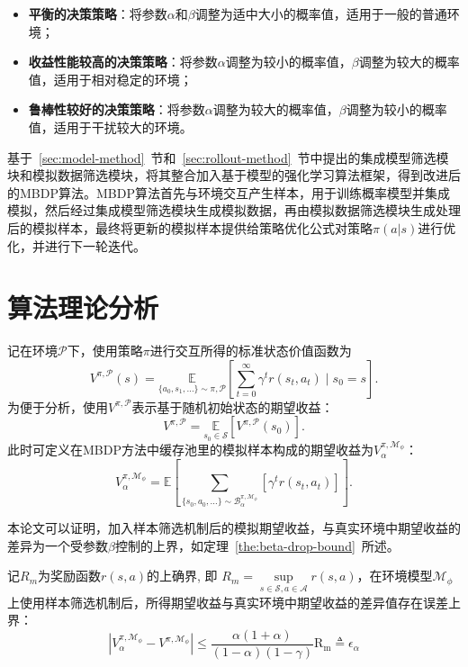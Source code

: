 \begin{itemize}
    \item \textbf{平衡的决策策略}：将参数$\alpha$和$\beta$调整为适中大小的概率值，适用于一般的普通环境；
    \item \textbf{收益性能较高的决策策略}：将参数$\alpha$调整为较小的概率值，$\beta$调整为较大的概率值，适用于相对稳定的环境；
    \item \textbf{鲁棒性较好的决策策略}：将参数$\alpha$调整为较大的概率值，$\beta$调整为较小的概率值，适用于干扰较大的环境。
\end{itemize}

基于~\ref{sec:model-method}~节和~\ref{sec:rollout-method}~节中提出的集成模型筛选模块和模拟数据筛选模块，将其整合加入基于模型的强化学习算法框架，得到改进后的MBDP算法。MBDP算法首先与环境交互产生样本，用于训练概率模型并集成模拟，然后经过集成模型筛选模块生成模拟数据，再由模拟数据筛选模块生成处理后的模拟样本，最终将更新的模拟样本提供给策略优化公式对策略$\pi(a|s)$进行优化，并进行下一轮迭代。

\section{算法理论分析}

记在环境$\mathcal{P}$下，使用策略$\pi$进行交互所得的标准状态价值函数为
\begin{equation}\label{def:eta-s}
    {V}^{\pi,\mathcal{P}}(s) = \underset{\{a_0,s_1,\ldots\} \sim \pi,\mathcal{P}}{\mathbb{E}}\left[\sum_{t=0}^\infty\gamma^t r(s_t,a_t)\mid s_0=s\right].
\end{equation}
为便于分析，使用${V}^{\pi,\mathcal{P}}$表示基于随机初始状态的期望收益：
\begin{equation}\label{def:eta-expectation}
    {V}^{\pi,\mathcal{P}} = \underset{s_0\in\mathcal{S}}{\mathbb{E}} \left[{V}^{\pi,\mathcal{P}}(s_0)\right].
\end{equation}
此时可定义在MBDP方法中缓存池里的模拟样本构成的期望收益为${V}^{\pi,\mathcal{M}_\phi}_\alpha$：
\begin{equation}\label{def:eta-beta}
    {V}^{\pi,\mathcal{M}_\phi}_\alpha=\mathbb{E}\left[{\sum}_{\{s_0,a_0,\ldots\} \sim\mathcal{B}_\alpha^{\pi,\mathcal{M}_\phi}}\left[\gamma^t r(s_t,a_t)\right]\right].
\end{equation}

本论文可以证明，加入样本筛选机制后的模拟期望收益，与真实环境中期望收益的差异为一个受参数$\beta$控制的上界，如定理~\ref{the:beta-drop-bound}~所述。

\begin{theorem}\label{the:beta-drop-bound}

记$R_{m}$为奖励函数$r(s,a)$的上确界, 即 $R_{m}=\underset{s\in\mathcal{S},a\in\mathcal{A}}{\sup}r(s,a)$，在环境模型$\mathcal{M}_\phi$上使用样本筛选机制后，所得期望收益与真实环境中期望收益的差异值存在误差上界：
\begin{equation}
    |{V}_\alpha^{\pi, \mathcal{M}_{\phi}} - {V}^{\pi,\mathcal{M}_{\phi}}| \leq \frac{\alpha(1+\alpha)}{(1-\alpha)(1-\gamma)}\mathrm{R_{m}} \triangleq \epsilon_\alpha
\label{eq:eps-beta}
\end{equation}
\end{theorem}

